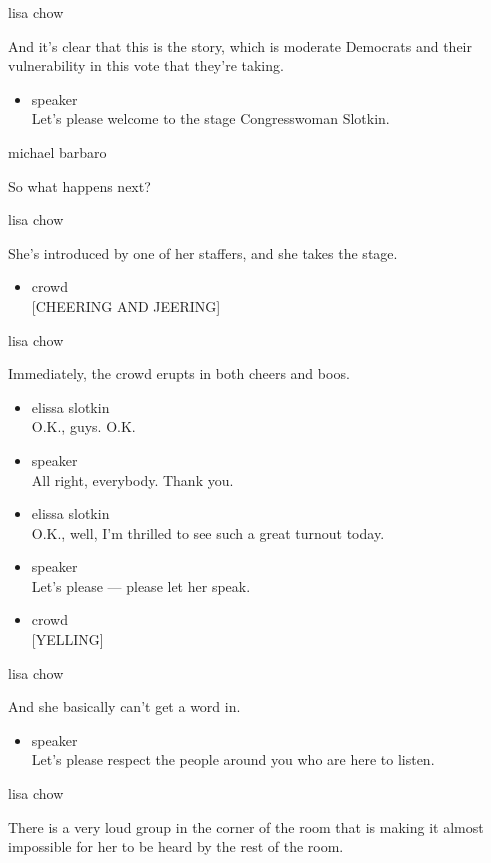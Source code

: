 lisa chow

And it's clear that this is the story, which is moderate Democrats and
their vulnerability in this vote that they're taking.

\begin{itemize}
\tightlist
\item
  speaker\\
  Let's please welcome to the stage Congresswoman Slotkin.
\end{itemize}

michael barbaro

So what happens next?

lisa chow

She's introduced by one of her staffers, and she takes the stage.

\begin{itemize}
\tightlist
\item
  crowd\\
  {[}CHEERING AND JEERING{]}
\end{itemize}

lisa chow

Immediately, the crowd erupts in both cheers and boos.

\begin{itemize}
\item
  elissa slotkin\\
  O.K., guys. O.K.
\item
  speaker\\
  All right, everybody. Thank you.
\item
  elissa slotkin\\
  O.K., well, I'm thrilled to see such a great turnout today.
\item
  speaker\\
  Let's please --- please let her speak.
\item
  crowd\\
  {[}YELLING{]}
\end{itemize}

lisa chow

And she basically can't get a word in.

\begin{itemize}
\tightlist
\item
  speaker\\
  Let's please respect the people around you who are here to listen.
\end{itemize}

lisa chow

There is a very loud group in the corner of the room that is making it
almost impossible for her to be heard by the rest of the room.

